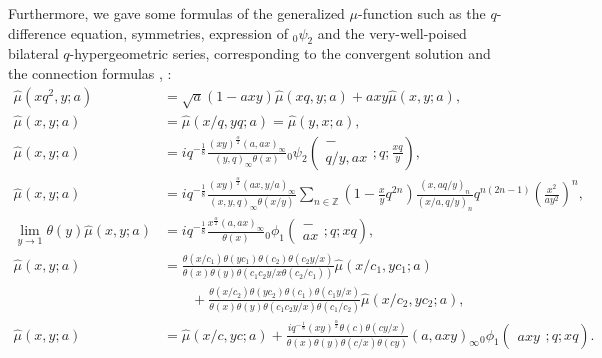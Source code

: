 \documentclass[a4paper]{article}
\newcommand{\Zz}{\mathbb{Z}}
\newcommand{\hyper}[4]{\left( \begin{matrix} #1 \\ #2 \end{matrix};#3;#4\right)}
\numberwithin{equation}{section}
\theoremstyle{plain}
\begin{document}
Furthermore, we gave some formulas of the generalized $\mu$-function such as the $q$-difference equation, symmetries, expression of ${}_0\psi_2$ and the very-well-poised bilateral $q$-hypergeometric series, corresponding to the convergent solution and the connection formulas \cite[Theorem 1.3]{ST1}, \cite[$(1.37)$--$(1.42)$]{ST2}: 
\begin{align}
\label{eq: gmu formula 1}
\widehat{\mu}(x q^2,y;a)
  &=
  \sqrt{a}(1-axy)\widehat{\mu}(x q,y;a)+a x y \widehat{\mu}(x,y;a), \\
\label{eq: gmu formula 2}
\widehat{\mu}(x,y;a)
  &=
  \widehat{\mu}(x/q,yq;a)
    =
    \widehat{\mu}(y,x;a), \\
\label{eq: gmu formula 3}
\widehat{\mu}(x,y;a)
  &=
  iq^{-\frac{1}{8}}\frac{(xy)^\frac{\alpha}{2}(a,ax)_\infty}{(y,q)_\infty\theta(x)}{}_0\psi_2\hyper{-}{q/y,ax}{q}{\frac{xq}{y}}, \\
\label{eq: gmu formula 4}
\widehat{\mu}(x,y;a)
  &=
  iq^{-\frac{1}{8}}\frac{(xy)^\frac{\alpha}{2}(ax,y/a)_\infty}{(x,y,q)_\infty\theta(x/y)}\sum_{n\in\Zz}\left(1-\frac{x}{y}q^{2n}\right)\frac{(x,aq/y)_n}{(x/a,q/y)_n}q^{n(2n-1)}\left(\frac{x^2}{ay^2}\right)^n, \\
\label{eq: gmu formula 5}
\lim_{y\to1}\theta(y)\widehat{\mu}(x,y;a)
  &=
  iq^{-\frac{1}{8}}\frac{x^\frac{\alpha}{2}(a,ax)_\infty}{\theta(x)}{}_0\phi_1\hyper{-}{ax}{q}{xq}, \\
\widehat{\mu}(x,y;a)
  &=
  \frac{\theta(x/c_1)\theta(y c_1)\theta(c_2)\theta(c_2y/x)}{\theta(x)\theta(y)\theta(c_1c_2y/x\theta(c_2/c_1))}\widehat{\mu}(x/c_1,yc_1;a) \nonumber \\
\label{eq: gmu formula 6}
    &\qquad +\frac{\theta(x/c_2)\theta(y c_2)\theta(c_1)\theta(c_1y/x)}{\theta(x)\theta(y)\theta(c_1c_2y/x)\theta(c_1/c_2)}\widehat{\mu}(x/c_2,yc_2;a), \\
\label{eq: gmu formula 7}
\widehat{\mu}(x,y;a)
  &=
  \widehat{\mu}(x/c,yc;a)
    +\frac{iq^{-\frac{1}{8}}(xy)^\frac{\alpha}{2}\theta(c)\theta(cy/x)}{\theta(x)\theta(y)\theta(c/x)\theta(cy)}(a,axy)_\infty{}_0\phi_1\hyper{}{axy}{q}{xq}. 
\end{align}
\end{document}
